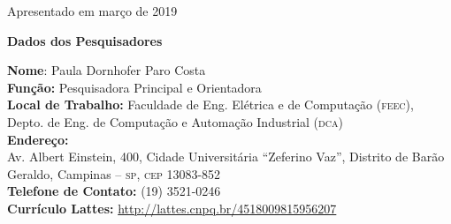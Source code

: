 \documentclass[a4paper,11pt,titlepage,singlespacing]{article}
\begin{document}
\begin{titlepage}
\begin{minipage}{0.5\textwidth}
\begin{flushleft}
               

    
    
        \end{flushleft}
    \end{minipage}	

    \vspace{2.4cm}     

    \begin{center}
        Apresentado em março de 2019
    \end{center}


\end{titlepage}


\begin{titlepage}
\noindent \Large{\textbf{Dados dos Pesquisadores}}\\

\vspace{10pt}
\begin{flushleft}
    \large{\textbf{Nome}: Paula Dornhofer Paro Costa}\\
    \large{\textbf{Função:} Pesquisadora Principal e Orientadora}\\
    \large{\textbf{Local de Trabalho:} Faculdade de Eng. Elétrica e de Computação (\textsc{feec}), \\ Depto. de Eng. de Computação e Automação Industrial (\textsc{dca})}\\
    \large{\textbf{Endereço:} \\Av. Albert Einstein, 400, Cidade Universitária ``Zeferino Vaz'', Distrito de Barão Geraldo, Campinas – \textsc{sp}, \textsc{cep} 13083-852}\\
    \large{\textbf{Telefone de Contato:} (19) 3521-0246 }\\
    \large{\textbf{Currículo Lattes:} \url{http://lattes.cnpq.br/4518009815956207}}\\
\end{flushleft}

\vspace{10pt}


\end{titlepage}
\end{document}
